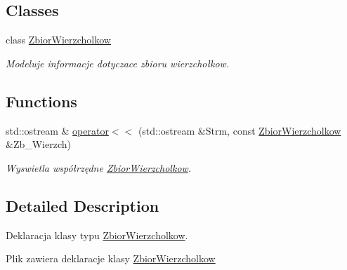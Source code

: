 \subsection*{Classes}
\begin{DoxyCompactItemize}
\item 
class \hyperlink{class_zbior_wierzcholkow}{Zbior\+Wierzcholkow}
\begin{DoxyCompactList}\small\item\em Modeluje informacje dotyczace zbioru wierzchołkow. \end{DoxyCompactList}\end{DoxyCompactItemize}
\subsection*{Functions}
\begin{DoxyCompactItemize}
\item 
\hypertarget{_zbior_wierzcholkow_8hh_a7738b1f9ac8291715496530031b772e9}{std\+::ostream \& \hyperlink{_zbior_wierzcholkow_8hh_a7738b1f9ac8291715496530031b772e9}{operator$<$$<$} (std\+::ostream \&Strm, const \hyperlink{class_zbior_wierzcholkow}{Zbior\+Wierzcholkow} \&Zb\+\_\+\+Wierzch)}\label{_zbior_wierzcholkow_8hh_a7738b1f9ac8291715496530031b772e9}

\begin{DoxyCompactList}\small\item\em Wyswietla współrzędne \hyperlink{class_zbior_wierzcholkow}{Zbior\+Wierzcholkow}. \end{DoxyCompactList}\end{DoxyCompactItemize}


\subsection{Detailed Description}
Deklaracja klasy typu \hyperlink{class_zbior_wierzcholkow}{Zbior\+Wierzcholkow}. 

Plik zawiera deklaracje klasy \hyperlink{class_zbior_wierzcholkow}{Zbior\+Wierzcholkow} 